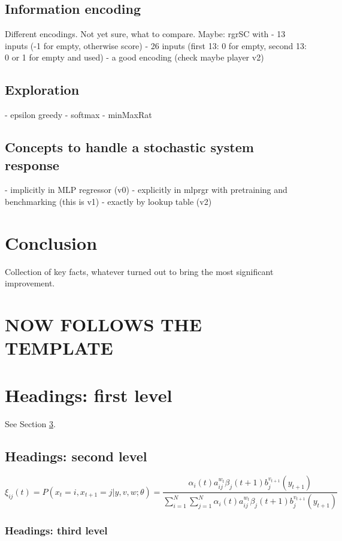 \documentclass{article}
\begin{document}
\subsection{Information encoding}
Different encodings. Not yet sure, what to compare.
Maybe: rgrSC with 
- 13 inputs (-1 for empty, otherwise score)
- 26 inputs (first 13: 0 for empty, second 13: 0 or 1 for empty and used)
- a good encoding (check maybe player v2)
\subsection{Exploration}
- epsilon greedy
- softmax
- minMaxRat
\subsection{Concepts to handle a stochastic system response}
- implicitly in MLP regressor (v0)
- explicitly in mlprgr with pretraining and benchmarking (this is v1)
- exactly by lookup table (v2)


\section{Conclusion}
Collection of key facts, whatever turned out to bring the most significant improvement.



\section{NOW FOLLOWS THE TEMPLATE}

\section{Headings: first level}
\label{sec:headings}

\lipsum[4] See Section \ref{sec:headings}.

\subsection{Headings: second level}
\lipsum[5]
\begin{equation}
\xi _{ij}(t)=P(x_{t}=i,x_{t+1}=j|y,v,w;\theta)= {\frac {\alpha _{i}(t)a^{w_t}_{ij}\beta _{j}(t+1)b^{v_{t+1}}_{j}(y_{t+1})}{\sum _{i=1}^{N} \sum _{j=1}^{N} \alpha _{i}(t)a^{w_t}_{ij}\beta _{j}(t+1)b^{v_{t+1}}_{j}(y_{t+1})}}
\end{equation}

\subsubsection{Headings: third level}
\lipsum[6]
\end{document}
